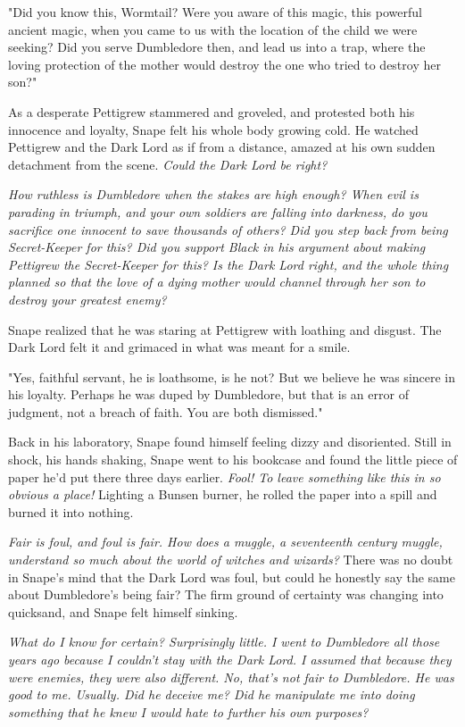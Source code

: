 "Did you know this, Wormtail? Were you aware of this magic, this powerful ancient magic, when you came to us with the location of the child we were seeking? Did you serve Dumbledore then, and lead us into a trap, where the loving protection of the mother would destroy the one who tried to destroy her son?"

As a desperate Pettigrew stammered and groveled, and protested both his innocence and loyalty, Snape felt his whole body growing cold. He watched Pettigrew and the Dark Lord as if from a distance, amazed at his own sudden detachment from the scene. \emph{Could the Dark Lord be right?}

\emph{How ruthless is Dumbledore when the stakes are high enough? When evil is parading in triumph, and your own soldiers are falling into darkness, do you sacrifice one innocent to save thousands of others? Did you step back from being Secret-Keeper for this? Did you support Black in his argument about making Pettigrew the Secret-Keeper for this? Is the Dark Lord right, and the whole thing planned so that the love of a dying mother would channel through her son to destroy your greatest enemy?}

Snape realized that he was staring at Pettigrew with loathing and disgust. The Dark Lord felt it and grimaced in what was meant for a smile.

"Yes, faithful servant, he is loathsome, is he not? But we believe he was sincere in his loyalty. Perhaps he was duped by Dumbledore, but that is an error of judgment, not a breach of faith. You are both dismissed."

Back in his laboratory, Snape found himself feeling dizzy and disoriented. Still in shock, his hands shaking, Snape went to his bookcase and found the little piece of paper he'd put there three days earlier. \emph{Fool! To leave something like this in so obvious a place!} Lighting a Bunsen burner, he rolled the paper into a spill and burned it into nothing.

\emph{Fair is foul, and foul is fair. How does a muggle, a seventeenth century muggle, understand so much about the world of witches and wizards?} There was no doubt in Snape's mind that the Dark Lord was foul, but could he honestly say the same about Dumbledore's being fair? The firm ground of certainty was changing into quicksand, and Snape felt himself sinking.

\emph{What do I know for certain? Surprisingly little. I went to Dumbledore all those years ago because I couldn't stay with the Dark Lord. I assumed that because they were enemies, they were also different. No, that's not fair to Dumbledore. He was good to me. Usually. Did he deceive me? Did he manipulate me into doing something that he knew I would hate to further his own purposes?}

